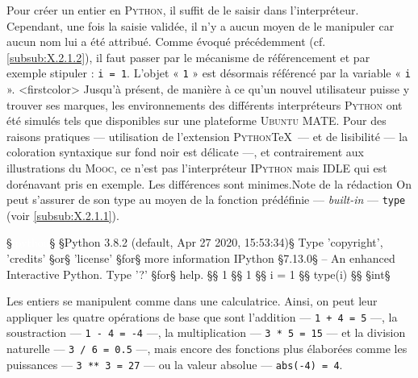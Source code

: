 

Pour créer un entier en \textsc{Python}, il suffit de le saisir dans l'interpréteur. Cependant, une fois la saisie validée, il n'y a aucun moyen de le manipuler car aucun nom lui a été attribué. Comme évoqué précédemment (cf. \cref{subsub:X.2.1.2}), il faut passer par le mécanisme de référencement et par exemple stipuler : \texttt{i = 1}. 
L'objet « \texttt{1} » est désormais référencé par la variable « \texttt{i} ».
\caution[t]<firstcolor>{%
Jusqu'à présent, de manière à ce qu'un nouvel utilisateur puisse y trouver ses marques, les environnements des différents interpréteurs \textsc{Python} ont été simulés tels que disponibles sur une plateforme \textsc{Ubuntu} MATE. Pour des raisons pratiques --- utilisation de l'extension \textsc{Python}\TeX\ --- et de lisibilité --- la coloration syntaxique sur fond noir est délicate ---, et contrairement aux illustrations du \textsc{Mooc}, ce n'est pas l'interpréteur \textsc{IPython} mais IDLE qui est dorénavant pris en exemple. Les différences sont minimes.}{Note de la rédaction}%
On peut s'assurer de son type au moyen de la fonction prédéfinie --- \textit{built-in} --- \texttt{type} (voir \cref{subsub:X.2.1.1}).

\vspace{4pt}%

\begin{ipythonminted}
§\textcolor{white}{ipython}§
§Python 3.8.2 (default, Apr 27 2020, 15:53:34)§
Type 'copyright', 'credits' §or§ 'license' §for§ more information
IPython §7.13.0§ -- An enhanced Interactive Python. Type '?' §for§ help.
§§ 1
§§ 1
§§ i = 1
§§ type(i)
§§ §int§
\end{ipythonminted}

\vspace{8pt}


Les entiers se manipulent comme dans une calculatrice. Ainsi, on peut leur appliquer les quatre opérations de base que sont l'addition --- \texttt{1 + 4 = 5} ---, la soustraction --- \texttt{1 - 4 = -4} ---, la multiplication  --- \texttt{3 * 5 = 15} --- et la division  naturelle --- \texttt{3 / 6 = 0.5} ---, mais encore des fonctions plus élaborées comme les puissances --- \texttt{3 ** 3 = 27} --- ou la valeur absolue --- \texttt{abs(-4) = 4}.

